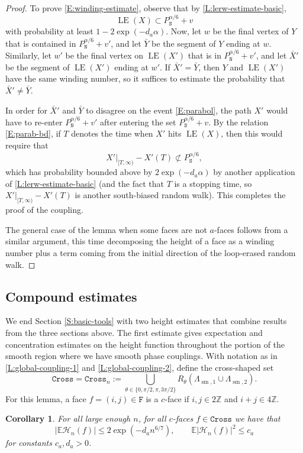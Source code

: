 \documentclass[11pt,twoside]{amsart}
\theoremstyle{plain}
\newtheorem{cor}[thm]{Corollary}
\numberwithin{quest}{section}
\theoremstyle{remark}
\numberwithin{rem}{section}
\theoremstyle{definition}
\newcommand{\Z}{\mathbb{Z}}
\newcommand{\E}{\mathbb{E}}
\renewcommand{\tt}[1]{{\mathtt{#1}}}
\begin{document}
\begin{proof}
		To prove \eqref{E:winding-estimate}, observe that by \cref{L:lerw-estimate-basic},
		\begin{equation}
			\label{E:parabol}
			\operatorname{LE}(X) \subset P^{\alpha/6}_\tt{S} + v
		\end{equation}
		with probability at least $1 - 2 \exp(-d_a \alpha)$. Now, let $w$ be the final vertex of $Y$ that is contained in $P_{\tt{N}}^{\alpha/6} + v'$, and let $\bar Y$ be the segment of $Y$ ending at $w$. Similarly, let $w'$ be the final vertex on $\operatorname{LE}(X')$ that is in $P_{\tt{N}}^{\alpha/6}+ v'$, and let $\bar X'$ be the segment of $\operatorname{LE}(X')$ ending at $w'$. If $\bar X' = \bar Y$, then $Y$ and $\operatorname{LE}(X')$ have the same winding number, so it suffices to estimate the probability that $\bar X' \ne \bar Y$.
		
	In order for $\bar X'$ and $\bar Y$ to disagree on the event \eqref{E:parabol}, the path $X'$ would have to re-enter $P_{\tt{N}}^{\alpha/6}+ v'$ after entering the set $P^{\alpha/6}_\tt{S} + v$. By the relation \eqref{E:parab-bd}, if $T$ denotes the time when $X'$ hits $\operatorname{LE}(X)$, then this would require that
		$$
		X'|_{[T, \infty)} - X'(T) \not \subset P_{\tt{S}}^{\alpha/6},
		$$
		which has probability bounded above by $2 \exp(-d_a \alpha)$ by another application of \cref{L:lerw-estimate-basic} (and the fact that $T$ is a stopping time, so $X'|_{[T, \infty)} - X'(T)$ is another south-biased random walk). This completes the proof of the coupling. 
		

		The general case of the lemma when some faces are not $a$-faces follows from a similar argument, this time decomposing the height of a face as a winding number plus a term coming from the initial direction of the loop-erased random walk.
	\end{proof}
	
	
		
	
	\subsection{Compound estimates}
	\label{S:compound-estimates}
	
	We end Section \ref{S:basic-tools} with two height estimates that combine results from the three sections above. The first estimate gives expectation and concentration estimates on the height function throughout the portion of the smooth region where we have smooth phase couplings. With notation as in \cref{L:global-coupling-1} and \ref{L:global-coupling-2}, define the cross-shaped set
	$$
	\tt{Cross} = \tt{Cross}_n := \bigcup_{\theta \in \{0, \pi/2, \pi, 3 \pi/2\}} R_{\theta} (\Lambda_{\operatorname{sm}, 1} \cup \Lambda_{\operatorname{sm}, 2}).
	$$
	For this lemma, a face $f = (i, j) \in \tt{F}$ is a $c$-face if $i, j \in 2 \Z$ and $i + j \in 4 \Z$.
	\begin{cor}
		\label{C:expected-sm-height}
		For all large enough $n$, for all $c$-faces $f \in \tt{Cross}$ we have that
		$$
		|\E \mathcal{H}_n(f)| \le 2 \exp(-d_a n^{6/7}), \qquad \E |\mathcal{H}_n(f)|^2 \le c_a
		$$ 
		for constants $c_a, d_a > 0$.
	\end{cor}
	
\end{document}
